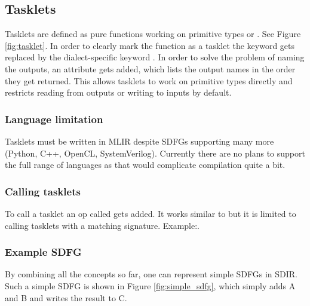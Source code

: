 \subsection{Tasklets} \label{section:tasklet}
Tasklets are defined as pure functions working on primitive types or . See Figure \ref{fig:tasklet}.
In order to clearly mark the function as a tasklet the keyword  gets replaced by the dialect-specific keyword . In order to solve the problem of naming the outputs, an attribute gets added, which lists the output names in the order they get returned. This allows tasklets to work on primitive types directly and restricts reading from outputs or writing to inputs by default.

\subsubsection{Language limitation}
Tasklets must be written in MLIR despite SDFGs supporting many more (Python, C++, OpenCL, SystemVerilog). Currently there are no plans to support the full range of languages as that would complicate compilation quite a bit.

\subsubsection{Calling tasklets}
To call a tasklet an op called  gets added. It works similar to  but it is limited to calling tasklets with a matching signature. Example:.

\subsubsection{Example SDFG}
By combining all the concepts so far, one can represent simple SDFGs in SDIR. Such a simple SDFG is shown in Figure \ref{fig:simple_sdfg}, which simply adds A and B and writes the result to C.
